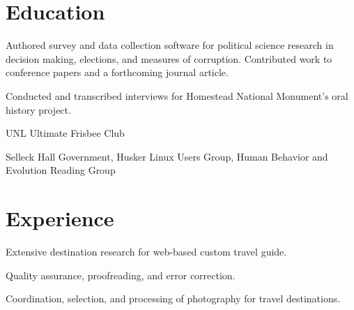 \documentclass[letterpaper]{cv_brennen}
\begin{document}
\author{Brennen Bearnes}

\maketitle

\section{Education}



\begin{compactitem}
\item Authored survey and data collection software for political science
      research in decision making, elections, and measures of corruption.
      Contributed work to conference papers and a forthcoming journal article.
\item Conducted and transcribed interviews for Homestead National Monument's
      oral history project.
\item UNL Ultimate Frisbee Club
\item Selleck Hall Government, Husker Linux Users Group, Human Behavior and
      Evolution Reading Group
\end{compactitem}

\section{Experience}


\begin{compactitem}
\item Extensive destination research for web-based custom travel guide.
\item Quality assurance, proofreading, and error correction.
\item Coordination, selection, and processing of photography for travel destinations.
\end{compactitem}
\end{document}
